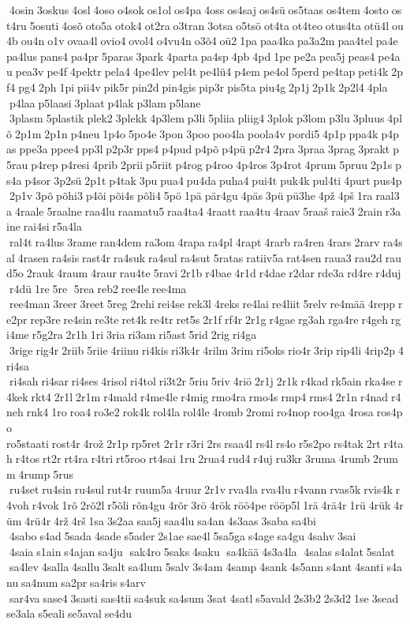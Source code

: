  4osin 3oskus 4osl 4oso o4sok os1ol os4pa 4oss os4saj os4sü os5taas os4tem 4osto ost4ru 5osuti 4osõ oto5a otok4 ot2ra o3tran 3otsa o5tsö ot4ta ot4teo otus4ta otü4l ou4b ou4n o1v ovaa4l ovio4 ovol4 o4vu4n o3õ4 oü2 1pa paa4ka pa3a2m paa4tel pa4e pa4lus pans4 pa4pr 5paras 3park 4parta pa4sp 4pb 4pd 1pe pe2a pea5j peas4 pe4au pea3v pe4f 4pektr pela4 4pe4lev pel4t pe4lü4 p4em pe4ol 5perd pe4tap peti4k 2pf4 pg4 2ph 1pi pii4v pik5r pin2d pin4gis pip3r pis5ta piu4g 2p1j 2p1k 2p2l4 4pla  p4laa p5laasi 3plaat p4lak p3lam p5lane  3plasm 5plastik plek2 3plekk 4p3lem p3li 5pliia pliig4 3plok p3lom p3lu 3pluus 4plõ 2p1m 2p1n p4neu 1p4o 5po4e 3pon 3poo poo4la poola4v pordi5 4p1p ppa4k p4pas ppe3a ppee4 pp3l p2p3r pps4 p4pud p4põ p4pü p2r4 2pra 3praa 3prag 3prakt p5rau p4rep p4resi 4prib 2prii p5riit p4rog p4roo 4p4ros 3p4rot 4prum 5pruu 2p1s ps4a p4sor 3p2sü 2p1t p4tak 3pu pua4 pu4da puha4 pui4t puk4k pul4ti 4purt pus4p 2p1v 3põ põhi3 p4õi põi4s põli4 5pö 1pä pär4gu 4päs 3pü pü3he 4pž 4pš 1ra raal3a 4raale 5raalne raa4lu raamatu5 raa4ta4 4raatt raa4tu 4raav 5raaš raie3 2rain r3aine rai4si r5a4la  ral4t ra4lus 3rame ran4dem ra3om 4rapa ra4pl 4rapt 4rarb ra4ren 4rars 2rarv ra4sal 4rasen ra4sis rast4r ra4suk ra4sul ra4sut 5ratas ratiiv5a rat4sen raua3 rau2d raud5o 2rauk 4raum 4raur rau4te 5ravi 2r1b r4bae 4r1d r4dae r2dar rde3a rd4re r4duj r4dü 1re 5re  5rea reb2 ree4le ree4ma  ree4man 3reer 3reet 5reg 2rehi rei4se rek3l 4reks re4lai re4liit 5relv re4mää 4repp re2pr rep3re re4sin re3te ret4k re4tr ret5s 2r1f rf4r 2r1g r4gae rg3ah rga4re r4geh rgi4me r5g2ra 2r1h 1ri 3ria ri3am ri5ast 5rid 2rig ri4ga  3rige rig4r 2riib 5riie 4riinu ri4kis ri3k4r 4rilm 3rim ri5oks rio4r 3rip rip4li 4rip2p 4ri4sa  ri4sah ri4sar ri4ses 4risol ri4tol ri3t2r 5riu 5riv 4riö 2r1j 2r1k r4kad rk5ain rka4se r4kek rkt4 2r1l 2r1m r4mald r4me4le r4mig rmo4ra rmo4s rmp4 rms4 2r1n r4nad r4neh rnk4 1ro roa4 ro3e2 rok4k rol4la rol4le 4romb 2romi ro4nop roo4ga 4rosa ros4po 	ro5staati rost4r 4rož 2r1p rp5ret 2r1r r3ri 2rs rsaa4l rs4l rs4o r5s2po rs4tak 2rt r4tah r4tos rt2r rt4ra r4tri rt5roo rt4sai 1ru 2rua4 rud4 r4uj ru3kr 3ruma 4rumb 2rumm 4rump 5rus  ru4set ru4sin ru4sul rut4r ruum5a 4ruur 2r1v rva4la rva4lu r4vann rvas5k rvis4k r4voh r4vok 1rõ 2rõ2l r5õli rõn4gu 4rõr 3rö 4rök röö4pe rööp5l 1rä 4rä4r 1rü 4rük 4rüm 4rü4r 4rž 4rš 1sa 3s2aa saa5j saa4lu sa4an 4s3aas 3saba sa4bi  4sabo s4ad 5sada 4sade s5ader 2s1ae sae4l 5sa5ga s4age sa4gu 4sahv 3sai  4saia s1ain s4ajan sa4ju  sak4ro 5saks 4saku  sa4kää 4s3a4la  4salas s4alat 5salat  sa4lev 4salla 4sallu 3salt sa4lum 5salv 3s4am 4samp 4sank 4s5ann s4ant 4santi s4anu sa4num sa2pr sa4ris s4arv  sar4va sase4 3sasti sas4tii sa4suk sa4sum 3sat 4satl s5avald 2s3b2 2s3d2 1se 3sead se3ala s5eali se5aval se4du 